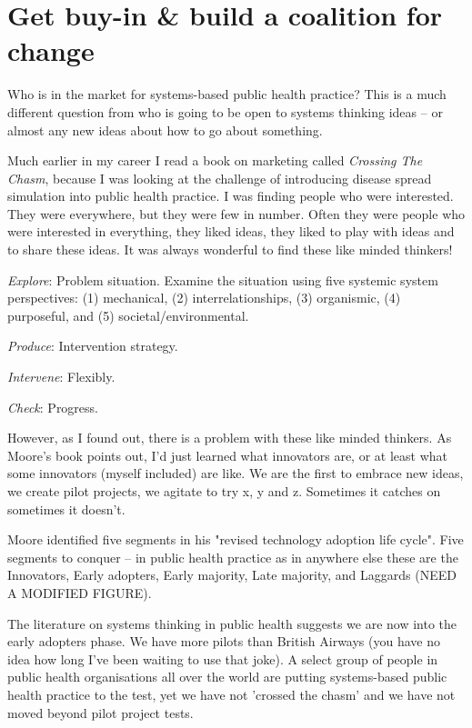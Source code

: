 \section{Get buy-in \& build a coalition for change}

Who is in the market for systems-based public health practice? This is a much different question from who is going to be open to systems thinking ideas -- or almost any new ideas about how to go about something.

Much earlier in my career I read a book on marketing called \emph{Crossing The Chasm}, because I was looking at the challenge of introducing disease spread simulation into public health practice. I was finding people who were interested. They were everywhere, but they were few in number. Often they were people who were interested in everything, they liked ideas, they liked to play with ideas and to share these ideas. It was always wonderful to find these like minded thinkers!

\emph{Explore}: Problem situation. Examine the situation using five systemic system perspectives: (1) mechanical, (2) interrelationships, (3) organismic, (4) purposeful, and (5) societal/environmental.

\emph{Produce}: Intervention strategy.

\emph{Intervene}: Flexibly.

\emph{Check}: Progress. 

However, as I found out, there is a problem with these like minded thinkers. As Moore's book points out, I'd just learned what innovators are, or at least what some innovators (myself included) are like. We are the first to embrace new ideas, we create pilot projects, we agitate to try x, y and z. Sometimes it catches on sometimes it doesn't.

Moore identified five segments in his "revised technology adoption life cycle". Five segments to conquer -- in public health practice as in anywhere else these are the Innovators, Early adopters, Early majority, Late majority, and Laggards (NEED A MODIFIED FIGURE).

The literature on systems thinking in public health suggests we are now into the early adopters phase. We have more pilots than British Airways (you have no idea how long I've been waiting to use that joke). A select group of people in public health organisations all over the world are putting systems-based public health practice to the test, yet we have not 'crossed the chasm' and we have not moved beyond pilot project tests.

